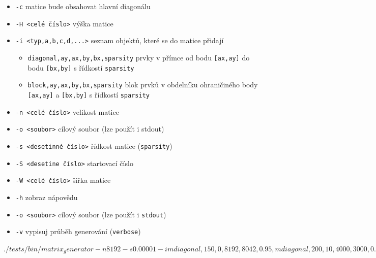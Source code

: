 \begin{itemize}
	\item \texttt{-c} matice bude obsahovat hlavní diagonálu
	\item \texttt{-H <celé číslo>} výška matice
	\item \texttt{-i <typ,a,b,c,d,...>} seznam objektů, které se do matice přidají
	\begin{itemize}
	\item \texttt{diagonal,ay,ax,by,bx,sparsity} prvky v přímce od bodu \texttt{[ax,ay]} do bodu \texttt{[bx,by]} s řídkostí \texttt{sparsity}
	\item \texttt{block,ay,ax,by,bx,sparsity} blok prvků v obdelníku ohraničiného body \texttt{[ax,ay]} a \texttt{[bx,by]} s řídkostí \texttt{sparsity}
	\end{itemize}
	\item \texttt{-n <celé číslo>} velikost matice
	\item \texttt{-o <soubor>} cílový soubor (lze použít i stdout)
	\item \texttt{-s <desetinné číslo>} řídkost matice (\texttt{sparsity})
	\item \texttt{-S <desetine číslo>} startovací číslo
	\item \texttt{-W <celé číslo>} šířka matice
\end{itemize}

\begin{itemize}
	\item \texttt{-h} zobraz nápovědu
	\item \texttt{-o <soubor>} cílový soubor (lze použít i \texttt{stdout}) 
	\item \texttt{-v} vypisuj průběh generování (\texttt{verbose})
\end{itemize}

\texttt{$ ./tests/bin/matrix_generator -n 8192 -s 0.00001 -i mdiagonal,150,0,8192,8042,0.95,mdiagonal,200,10,4000,3000,0.75,mblockwh,300,1500,256,256,0.95,mblockwh,700,2000,128,128,0.95,mrblocks,10,128,64,64,0.75 -o /tmp/matrix2.mtx$}

